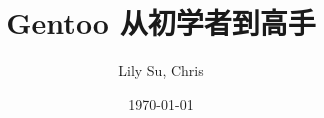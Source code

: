 \documentclass{book}
\author{Lily Su, Chris}
\date{\today}
\begin{document}
\title{Gentoo 从初学者到高手}
\maketitle
%
\frontmatter
\tableofcontents
%






















\end{document}
